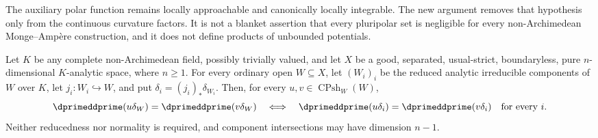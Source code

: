 The auxiliary polar function remains locally approachable and canonically
locally integrable.  The new argument removes that hypothesis only from the
continuous curvature factors.  It is not a blanket assertion that every
pluripolar set is negligible for every non-Archimedean Monge--Amp\`ere
construction, and it does not define products of unbounded potentials.

\begin{corollary}
\label{cor:ch16-cpsh-component-curvature}
Let $K$ be any complete non-Archimedean field, possibly trivially valued,
and let $X$ be a good, separated, usual-strict, boundaryless, pure
$n$-dimensional $K$-analytic space, where $n\geq1$.
For every ordinary open $W\subseteq X$, let $(W_i)_i$ be the reduced
analytic irreducible components of $W$ over $K$, let
$j_i:W_i\hookrightarrow W$, and put
$\delta_i=(j_i)_*\delta_{W_i}$.  Then, for every
$u,v\in\operatorname{CPsh}_W(W)$,
\begin{equation}
 \dprimeddprime(u\delta_W)=\dprimeddprime(v\delta_W)
 \quad\Longleftrightarrow\quad
 \dprimeddprime(u\delta_i)=\dprimeddprime(v\delta_i)
 \quad\text{for every }i .
 \label{eq:ch16-cpsh-component-curvature}
\end{equation}
Neither reducedness nor normality is required, and component intersections
may have dimension $n-1$.
\end{corollary}

